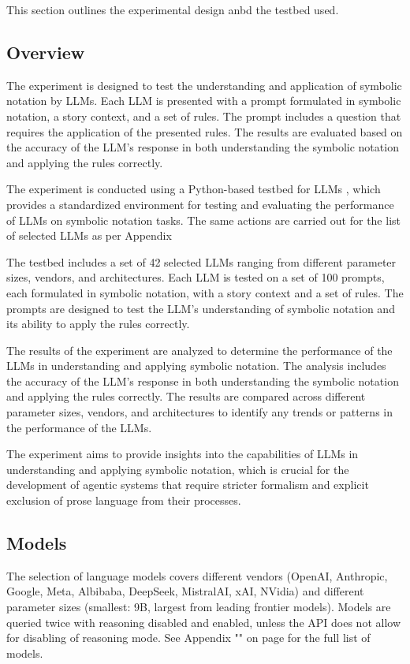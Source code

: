 This section outlines the experimental design anbd the testbed used.

\subsection{Overview}
The experiment is designed to test the understanding and application of symbolic notation by LLMs. Each LLM is presented with a prompt 
formulated in symbolic notation, a story context, and a set of rules. The prompt includes a question that requires the application of the 
presented rules. The results are evaluated based on the accuracy of the LLM's response in both understanding the symbolic notation and 
applying the rules correctly.

The experiment is conducted using a Python-based testbed for LLMs \autocite{aisymbolicprogllms}, which provides a standardized 
environment for testing and evaluating the performance of LLMs on symbolic notation tasks. The same actions are carried out for the list of 
selected LLMs as per Appendix 

The testbed includes a set of 42 selected LLMs ranging from different parameter sizes, vendors, and architectures. 
Each LLM is tested on a set of 100 prompts, each formulated in symbolic notation, with a story context and a set of rules. 
The prompts are designed to test the LLM's understanding of symbolic notation and its ability to apply the rules correctly.

The results of the experiment are analyzed to determine the performance of the LLMs in understanding and applying symbolic notation. 
The analysis includes the accuracy of the LLM's response in both understanding the symbolic notation and applying the rules correctly. 
The results are compared across different parameter sizes, vendors, and architectures to identify any trends or patterns in the performance of the LLMs.

The experiment aims to provide insights into the capabilities of LLMs in understanding and applying symbolic notation, which is crucial 
for the development of agentic systems that require stricter formalism and explicit exclusion of prose language from their processes.

\subsection{Models}
The selection of language models covers different vendors (OpenAI, Anthropic, Google, Meta, Albibaba, DeepSeek, MistralAI, xAI, NVidia) and different 
parameter sizes (smallest: 9B, largest from leading frontier models). Models are queried twice with reasoning disabled and enabled, unless the API does not
allow for disabling of reasoning mode. See Appendix "" on page \pageref{tab:models} for the full list of models.

